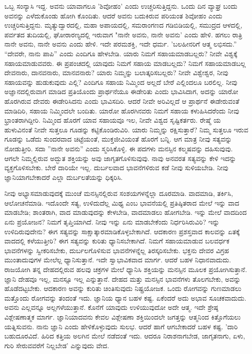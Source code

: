 ಒಬ್ಬ ಸಂನ್ಯಾಸಿ ಇದ್ದ. ಅವನು ಯಾವಾಗಲೂ 'ಶಿವೋಹಂ' ಎಂದು ಉಚ್ಚರಿಸುತ್ತಿದ್ದನು. ಒಂದು ದಿನ ವ್ಯಾಘ್ರ ಬಂದು ಅವನನ್ನು ಎಳೆದುಕೊಂಡು ಹೋಗಿ ಕೊಂದಿತು. ಆದರೆ ಅವನು ಬದುಕಿರುವ ಪರಿಯಂತ ಶಿವೋಹಂ ಎಂದು ಉಚ್ಚರಿಸುತ್ತಿದ್ದನು. ಮೃತ್ಯುದ್ವಾರದಲ್ಲಿ, ಮಹಾ ಅಪಾಯದಲ್ಲಿ, ಸಮರಾಂಗಣದ ಗಡಿಬಿಡಿಯಲ್ಲಿ, ಸಮುದ್ರದ ಆಳದಲ್ಲಿ, ಪರ್ವತದ ತುದಿಯಲ್ಲಿ, ಘೋರಾರಣ್ಯದಲ್ಲಿ ಇರುವಾಗ "ನಾನೇ ಅವನು, ನಾನೇ ಅವನು' ಎಂದು ಹೇಳಿ. ಹಗಲು ರಾತ್ರಿ ನಾನೇ ಅವನು, ನಾನೇ ಅವನು ಎಂದು ಹೇಳಿ. ಇದೇ ಪರಮಶಕ್ತಿ, ಇದೇ ಧರ್ಮ. 'ಬಲಹೀನರಿಗೆ ಆತ್ಮ ಲಭಿಸದು.” “ದೇವರೇ, ನಾನು ಪಾಪಿ'' ಎಂದು ಎಂದಿಗೂ ಹೇಳಬೇಡಿ. ಯಾರು ನಿಮಗೆ ಸಹಾಯಮಾಡಬಲ್ಲರು? ನೀವೇ ವಿಶ್ವಕ್ಕೆ ಸಹಾಯಮಾಡುವವರು. ಈ ಪ್ರಪಂಚದಲ್ಲಿ ಯಾವುದು ನಿಮಗೆ ಸಹಾಯ ಮಾಡಬಲ್ಲದು? ನಿಮಗೆ ಸಹಾಯಮಾಡಬಲ್ಲ ದೇವನಾರು, ದಾನವನಾರು, ಮಾನವನಾರು? ಯಾರು ನಿಮ್ಮನ್ನು ಬಲಾತ್ಕರಿಸಬಲ್ಲರು? ನೀವೇ ವಿಶ್ವೇಶ್ವರ, ನೀವು ಸಹಾಯವನ್ನು ಹುಡುಕುವುದು ಎಲ್ಲಿ? ಎಂದಿಗೂ ಸಹಾಯ ನಿಮ್ಮಿಂದ ಅಲ್ಲದೆ ಬೇರೆ ಎಲ್ಲಿಂದಲೂ ಬರಲಿಲ್ಲ. ನೀವು ಅಜ್ಞಾನದಲ್ಲಿರುವಾಗ ಮಾಡಿದ ಪ್ರತಿಯೊಂದು ಪ್ರಾರ್ಥನೆಯೂ ಈಡೇರಿತು ಎಂದು ಭಾವಿಸಿದಾಗ, ಅದನ್ನು ಯಾರೋ ಹೊರಗಿರುವ ದೇವರು ಈಡೇರಿಸಿದನು ಎಂದು ಭಾವಿಸದಿರಿ. ಆದರೆ ನೀವೇ ಅರಿವಿಲ್ಲದೆ ಆ ಪ್ರಾರ್ಥನೆ ಈಡೇರುವಂತೆ ಮಾಡಿದಿರಿ, ಸಹಾಯ ನಿಮ್ಮಿಂದಲೇ ಬಂದಿತು. ಯಾರೋ ಹೊರಗಿನವರು ನಿಮಗೆ ಸಹಾಯ ಕಳುಹಿಸಿದರೆಂದು ನೀವು ಭ್ರಾಂತರಾಗಿದ್ದೀರಿ. ನಿಮ್ಮಿಂದ ಹೊರಗೆ ಯಾವ ಸಹಾಯವೂ ಇಲ, ನೀವೇ ವಿಶ್ವದ ಸೃಷ್ಟಿಕರ್ತರು. ರೇಷ್ಮೆ ಯ ಹುಳುವಿನಂತೆ ನೀವೇ ಸುತ್ತಲೂ ಗೂಡನ್ನು ಕಟ್ಟಿಕೊಂಡಿರುವಿರಿ. ಯಾರು ನಿಮ್ಮನ್ನು ರಕ್ಷಿಸುತ್ತಾರೆ? ನಿಮ್ಮ ಸುತ್ತಲೂ ಇರುವ ಗೂಡನ್ನು ಒಡೆದು ಸುಂದರವಾದ ಚಿಟ್ಟೆಯಂತೆ, ಮುಕ್ತಜೀವಿಯಂತೆ ಹೊರಗೆ ಬನ್ನಿ. ಆಗ ಮಾತ್ರ ನೀವು ಸತ್ಯವನ್ನು ನೋಡುತ್ತೀರಿ. ಸದಾ ''ನಾನೇ ಅವನು” ಎಂದು ಸ್ಮರಿಸಿಕೊಳ್ಳಿ. ಈ ಪದಗಳು ಮನಸ್ಸಿನ ಕಲ್ಮಷವನ್ನು ದಹಿಸುವುವು. ಆಗಲೇ ನಿಮ್ಮಲ್ಲಿರುವ ಅದ್ಭುತ ಶಕ್ತಿಯನ್ನು ಅವು ಜಾಗೃತಗೊಳಿಸುವುವು. ನಾವು ಅನವರತ ಸತ್ಯವನ್ನು ಕೇಳಿ ಇದನ್ನು ವ್ಯಕ್ತಗೊಳಿಸಬೇಕು. ಬೇರೆ ದಾರಿಯೇ ಇಲ್ಲ. ದುರ್ಬಲವಾದ ಭಾವನೆಗಳಿರುವ ಕಡೆ ನೀವು ಸುಳಿಯಬೇಡಿ. ನೀವು ಜ್ಞಾನಿಯಾಗಬೇಕಾದರೆ ಎಲ್ಲಾ ದುರ್ಬಲತೆಯನ್ನು ಧಿಕ್ಕರಿಸಿ.

ನೀವು ಅಭ್ಯಾಸಮಾಡುವುದಕ್ಕೆ ಮುಂಚೆ ಮನಸ್ಸಿನಲ್ಲಿರುವ ಸಂಶಯಗಳನ್ನೆಲ್ಲಾ ದೂರಮಾಡಿ. ವಾದಮಾಡಿ, ತರ್ಕಿಸಿ, ಆಲೋಚನೆಮಾಡಿ. ಇದೊಂದೇ ಸತ್ಯ, ಉಳಿದುದೆಲ್ಲ ಮಿಥ್ಯ ಎಂಬ ಭಾವನೆಯಲ್ಲಿ ಪ್ರತಿಷ್ಠಿತರಾದ ಮೇಲೆ ಇನ್ನು ವಾದ ಮಾಡಬೇಡಿ; ಶಾಂತರಾಗಿ, ವಾದ ಮಾಡುವುದನ್ನು ಕೇಳಬೇಡಿ, ವಾದಮಾಡಲು ಹೋಗಬೇಡಿ. ಇನ್ನು ಮೇಲೆ ವಾದದಿಂದ ಏನು ಪ್ರಯೋಜನ? ನಿಮಗೆ ತೃಪ್ತಿಯಾಗಿದೆ. ನೀವು ಇನ್ನು ಏನು ಮಾಡಬೇಕೆಂದು ನಿರ್ಧರಿಸಿರುವಿರಿ? ಇನ್ನು ಉಳಿದಿರುವುದೇನು? ಈಗ ಸತ್ಯವನ್ನು ಸಾಕ್ಷಾತ್ಕಾರಮಾಡಿಕೊಳ್ಳಬೇಕಾಗಿದೆ. ಆದಕಾರಣ ಪ್ರಶಸ್ತವಾದ ಕಾಲವನ್ನು ಏತಕ್ಕೆ ವಾದದಲ್ಲಿ ಕಳೆಯುತ್ತೀರಿ? ಈಗ ಸತ್ಯವನ್ನು ಕುರಿತು ಧ್ಯಾನಿಸಬೇಕಾಗಿದೆ. ನಿಮಗೆ ಸಹಾಯಮಾಡುವ ಬಲವರ್ಧಕ ಭಾವನೆಗಳನ್ನು ಸ್ವೀಕರಿಸಬೇಕು, ದುರ್ಬಲಗೊಳಿಸುವ ಭಾವನೆಗಳನ್ನೆಲ್ಲ ತಿರಸ್ಕರಿಸಬೇಕು. ಭಕ್ತನು ದೇವರ ವಿಗ್ರಹ ಮುಂತಾದುವುಗಳ ಮೇಲೆಲ್ಲ ಧ್ಯಾನಿಸುತ್ತಾನೆ. ಇದೇ ಸ್ವಾಭಾವಿಕವಾದ ಮಾರ್ಗ. ಆದರೆ ಬಹಳ ನಿಧಾನವಾದುದು. ರಾಜಯೋಗಿ ತನ್ನ ದೇಹದಲ್ಲಿರುವ ಹಲವು ಚಕ್ರಗಳ ಮೇಲೆ ಧ್ಯಾನಿಸಿ ಶಕ್ತಿಯನ್ನು ಮನಸ್ಸಿನ ಮೂಲಕ ಪ್ರಯೋಗಿಸುತ್ತಾನೆ. ಜ್ಞಾನಿ ದೇಹವೂ ಇಲ್ಲ, ಮನಸ್ಸೂ ಇಲ್ಲ ಎನ್ನುತ್ತಾನೆ. ದೇಹದ ಮತ್ತು ಮನಸ್ಸಿನ ಭಾವನೆಗಳು ತೊಲಗಬೇಕು, ಅವನ್ನು ಹೊಡೆದಟ್ಟಬೇಕು. ಆದಕಾರಣ ಅವನ್ನು ಕುರಿತು ಚಿಂತಿಸುವುದು ನಿಷ್ಪ್ರಯೋಜಕ. ಒಂದು ರೋಗವನ್ನು ಗುಣಮಾಡಲು ಮತ್ತೊಂದು ರೋಗವನ್ನು ತಂದಂತೆ ಇದು. ಜ್ಞಾನಿಯ ಧ್ಯಾನ ಬಹಳ ಕಷ್ಟ. ಏಕೆಂದರೆ ಅದು ಅಭಾವ ಸೂಚಕವಾದುದು. ಅವನು ಎಲ್ಲವನ್ನೂ ಅಲ್ಲಗಳೆಯುತ್ತಾನೆ. ಕೊನೆಗೆ ಯಾವುದು ಉಳಿಯುವುದೋ ಅದೇ ಆತ್ಮ. ಇದೇ ಶ್ರೇಷ್ಠ ವಿಶ್ಲೇಷಣಾತ್ಮಕ ಮಾರ್ಗ. ಜ್ಞಾನಿಯಾದವನು ಕೇವಲ ವಿಶ್ಲೇಷಣಾ ಶಕ್ತಿಯಿಂದಲೇ ಜಗತ್ತನ್ನು ಆತ್ಮನಿಂದ ಕಿತ್ತೊಗೆಯಲು ಯತ್ನಿಸುವನು. ನಾನು ಜ್ಞಾನಿ ಎಂದು ಹೇಳಿಕೊಳ್ಳುವುದು ಸುಲಭ. ಆದರೆ ಹಾಗೆ ಆಗಬೇಕಾದರೆ ಬಹಳ ಕಷ್ಟ. 'ದಾರಿ ಬಹುದೂರವಿದೆ. ಹಿರಿದ ಕತ್ತಿಯ ಅಲಗಿನ ಮೇಲೆ ನಡೆದಂತೆ ಇದು. ಆದರೂ ನಿರಾಶನಾಗಬೇಡ, ಜಾಗೃತನಾಗು, ಏಳು, ಗುರಿ ಸೇರುವವರೆಗೆ ನಿಲ್ಲಬೇಡ' ಎನ್ನುವುದು ವೇದ.

